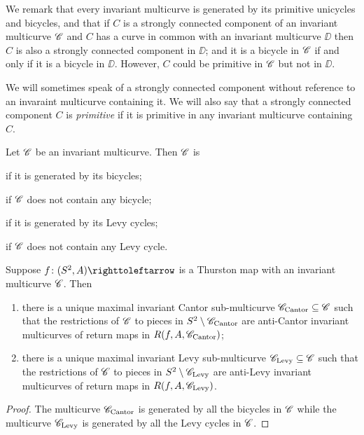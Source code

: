 \documentclass{amsart}
\begin{document}
We remark that every invariant multicurve is generated by its
primitive unicycles and bicycles, and that if $C$ is a strongly
connected component of an invariant multicurve ${\mathscr C}$ and $C$ has a
curve in common with an invariant multicurve $\DD$ then $C$ is also a
strongly connected component in $\DD$; and it is a bicycle in ${\mathscr C}$ if
and only if it is a bicycle in $\DD$. However, $C$ could be primitive
in ${\mathscr C}$ but not in $\DD$.

We will sometimes speak of a strongly connected component without
reference to an invaraint multicurve containing it. We will also say
that a strongly connected component $C$ is \emph{primitive} if it is
primitive in any invariant multicurve containing $C$.

\begin{defn}
  Let ${\mathscr C}$ be an invariant multicurve. Then ${\mathscr C}$ is
  \begin{idescription}
  \item[Cantor] if it is generated by its bicycles;
  \item[anti-Cantor] if ${\mathscr C}$ does not contain any bicycle;
  \item[Levy] if it is generated by its Levy cycles;
  \item[anti-Levy] if ${\mathscr C}$ does not contain any Levy cycle.\qedhere
  \end{idescription}
\end{defn}

\begin{prop}\label{Prop:CantorMultCurv}
  Suppose $f\colon(S^2, A)\selfmap$ is a Thurston map with an
  invariant multicurve ${\mathscr C}$. Then
  \begin{enumerate}
  \item there is a unique maximal invariant Cantor sub-multicurve
    ${\mathscr C}_{\text{Cantor}}\subseteq{\mathscr C}$ such that the restrictions of
    ${\mathscr C}$ to pieces in $S^2\setminus{\mathscr C}_{\text{Cantor}}$ are
    anti-Cantor invariant multicurves of return maps in
    $R(f,A,{\mathscr C}_{\text{Cantor}})$;
  \item there is a unique maximal invariant Levy sub-multicurve
    ${\mathscr C}_{\text{Levy}}\subseteq{\mathscr C}$ such that the restrictions of
    ${\mathscr C}$ to pieces in $S^2\setminus{\mathscr C}_{\text{Levy}}$ are anti-Levy
    invariant multicurves of return maps in
    $R(f,A,{\mathscr C}_{\text{Levy}})$.
\end{enumerate}
\end{prop}
\begin{proof}
  The multicurve ${\mathscr C}_{\text{Cantor}}$ is generated by all the
  bicycles in ${\mathscr C}$ while the multicurve ${\mathscr C}_{\text{Levy}}$ is
  generated by all the Levy cycles in ${\mathscr C}$.
\end{proof}
\end{document}
